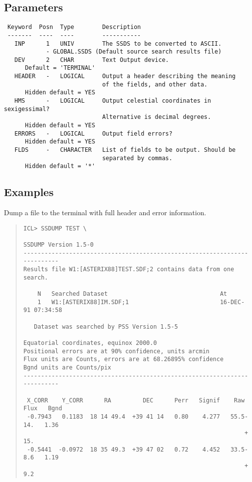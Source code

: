 \documentclass{book}
\renewcommand{\_}{{\tt\char'137}}     %
\begin{document}
\subsection{Parameters}
\begin{verbatim}
 Keyword  Posn  Type        Description
 -------  ----  ----        -----------
   INP      1   UNIV        The SSDS to be converted to ASCII.
            - GLOBAL.SSDS (Default source search results file)
   DEV      2   CHAR        Text Output device.
      Default = 'TERMINAL'
   HEADER   -   LOGICAL     Output a header describing the meaning
                            of the fields, and other data.
      Hidden default = YES
   HMS      -   LOGICAL     Output celestial coordinates in sexigessimal?
                            Alternative is decimal degrees.
      Hidden default = YES
   ERRORS   -   LOGICAL     Output field errors?
      Hidden default = YES
   FLDS     -   CHARACTER   List of fields to be output. Should be
                            separated by commas.
      Hidden default = '*'

\end{verbatim}\subsection{Examples}
Dump a file to the terminal with full header and error information.
\begin{quote}\begin{verbatim}
ICL> SSDUMP TEST \

SSDUMP Version 1.5-0
--------------------------------------------------------------------------
Results file W1:[ASTERIX88]TEST.SDF;2 contains data from one search.

    N   Searched Dataset                                At
    1   W1:[ASTERIX88]IM.SDF;1                          16-DEC-91 07:34:58

   Dataset was searched by PSS Version 1.5-5

Equatorial coordinates, equinox 2000.0
Positional errors are at 90% confidence, units arcmin
Flux units are Counts, errors are at 68.26895% confidence
Bgnd units are Counts/pix
--------------------------------------------------------------------------

 X_CORR    Y_CORR      RA         DEC      Perr   Signif    Raw Flux   Bgnd
 -0.7943   0.1183  18 14 49.4  +39 41 14   0.80    4.277   55.5- 14.   1.36
                                                               + 15.
 -0.5441  -0.0972  18 35 49.3  +39 47 02   0.72    4.452   33.5- 8.6   1.19
                                                               + 9.2
\end{verbatim}\end{quote}
\end{document}
